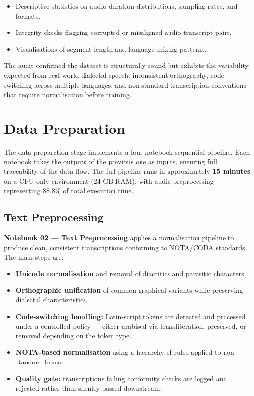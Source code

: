 \documentclass[12pt,a4paper]{report}
\begin{document}
\begin{itemize}
    \item Descriptive statistics on audio duration distributions, sampling rates, and formats.
    \item Integrity checks flagging corrupted or misaligned audio-transcript pairs.
    \item Visualisations of segment length and language mixing patterns.
\end{itemize}

The audit confirmed the dataset is structurally sound but exhibits the variability expected
from real-world dialectal speech: inconsistent orthography, code-switching across multiple
languages, and non-standard transcription conventions that require normalisation before
training.

\section{Data Preparation}

The data preparation stage implements a four-notebook sequential pipeline. Each notebook
takes the outputs of the previous one as inputs, ensuring full traceability of the data flow.
The full pipeline runs in approximately \textbf{15 minutes} on a CPU-only environment
(24 GB RAM), with audio preprocessing representing 88.8\% of total execution time.

\subsection{Text Preprocessing}

\textbf{Notebook 02 — Text Preprocessing} applies a normalisation pipeline to produce
clean, consistent transcriptions conforming to NOTA/CODA standards. The main steps are:

\begin{itemize}
    \item \textbf{Unicode normalisation} and removal of diacritics and parasitic characters.
    \item \textbf{Orthographic unification} of common graphical variants while preserving
    dialectal characteristics.
    \item \textbf{Code-switching handling:} Latin-script tokens are detected and processed
    under a controlled policy — either arabised via transliteration, preserved, or removed
    depending on the token type.
    \item \textbf{NOTA-based normalisation} using a hierarchy of rules applied to
    non-standard forms.
    \item \textbf{Quality gate:} transcriptions failing conformity checks are logged and
    rejected rather than silently passed downstream.
\end{itemize}
\end{document}
